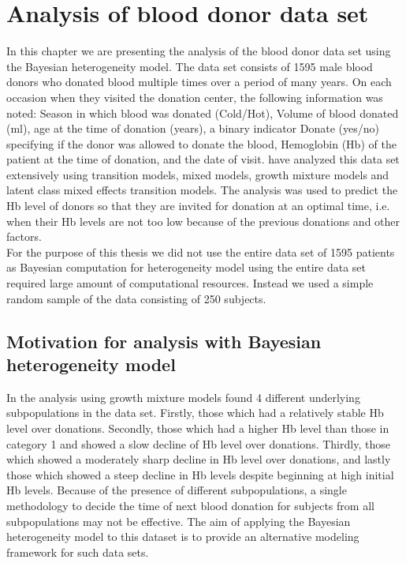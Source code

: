 
\chapter{Analysis of blood donor data set}
\label{ch : blood_donor}
 
 In this chapter we are presenting the analysis of the blood donor data set \citep{nasserinejad_prevalence_2015} using the Bayesian heterogeneity model. The data set consists of 1595 male blood donors who donated blood multiple times over a period of many years. On each occasion when they visited the donation center, the following information was noted: Season in which blood was donated (Cold/Hot), Volume of blood donated (ml), age at the time of donation (years), a binary indicator Donate (yes/no) specifying if the donor was allowed to donate the blood, Hemoglobin (Hb) of the patient at the time of donation, and the date of visit. \citet{nasserinejad_predicting_2013,nasserinejad_prevalence_2015,nasserinejad_prediction_2016} have analyzed this data set extensively using transition models, mixed models, growth mixture models and latent class mixed effects transition models. The analysis was used to predict the Hb level of donors so that they are invited for donation at an optimal time, i.e. when their Hb levels are not too low because of the previous donations and other factors.\\

 For the purpose of this thesis we did not use the entire data set of 1595 patients as Bayesian computation for heterogeneity model using the entire data set required large amount of computational resources. Instead we used a simple random sample of the data consisting of 250 subjects.

\section{Motivation for analysis with Bayesian heterogeneity model}
 In the analysis using growth mixture models \citet{nasserinejad_prevalence_2015} found 4 different underlying subpopulations in the data set. Firstly, those which had a relatively stable Hb level over donations. Secondly, those which had a higher Hb level than those in category 1 and showed a slow decline of Hb level over donations. Thirdly, those which showed a moderately sharp decline in Hb level over donations, and lastly those which showed a steep decline in Hb levels despite beginning at high initial Hb levels. Because of the presence of different subpopulations, a single methodology to decide the time of next blood donation for subjects from all subpopulations may not be effective. The aim of applying the Bayesian heterogeneity model to this dataset is to provide an alternative modeling framework for such data sets.

